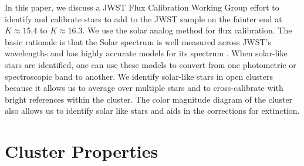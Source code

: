 \documentclass{aastex6}
\begin{document}
In this paper, we discuss a JWST Flux Calibration Working Group effort to identify and calibrate stars to add to the JWST sample on the fainter end at $K \approx 15.4$ to $K \approx 16.3$.
We use the solar analog method \citep{rieke2008absIRcal,johnson1965solarAnalogMethod,megessier1995solarAnalogCal} for flux calibration.
The basic rationale is that the Solar spectrum is well measured across JWST's wavelengths \citep[0.6~$\mu$m to 29~$\mu$m][]{gardner2006SSRv} and has highly accurate models for its spectrum \citep[e.g.][]{gueymard2018solarSpectrum}.
When solar-like stars are identified, one can use these models to convert from one photometric or spectroscopic band to another.
We identify solar-like stars in open clusters because it allows us to average over multiple stars and to cross-calibrate with bright references within the cluster.
The color magnitude diagram of the cluster also allows us to identify solar like stars and aids in the corrections for extinction.

\section{Cluster Properties}
\end{document}
